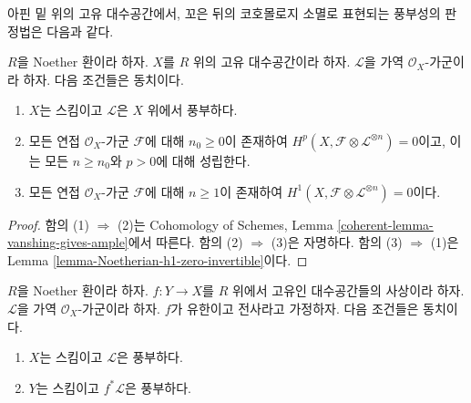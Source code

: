 \noindent
아핀 밑 위의 고유 대수공간에서, 꼬은 뒤의 코호몰로지 소멸로
표현되는 풍부성의 판정법은 다음과 같다.

\begin{lemma}
\label{lemma-vanshing-gives-ample}
$R$을 Noether 환이라 하자. $X$를 $R$ 위의 고유 대수공간이라 하자.
$\mathcal{L}$을 가역 $\mathcal{O}_X$-가군이라 하자. 다음 조건들은
동치이다.
\begin{enumerate}
\item $X$는 스킴이고 $\mathcal{L}$은 $X$ 위에서 풍부하다.
\item 모든 연접 $\mathcal{O}_X$-가군 $\mathcal{F}$에 대해
$n_0 \geq 0$이 존재하여
$H^p(X, \mathcal{F} \otimes \mathcal{L}^{\otimes n}) = 0$이고, 이는
모든 $n \geq n_0$와 $p > 0$에 대해 성립한다.
\item 모든 연접 $\mathcal{O}_X$-가군 $\mathcal{F}$에 대해
$n \geq 1$이 존재하여
$H^1(X, \mathcal{F} \otimes \mathcal{L}^{\otimes n}) = 0$이다.
\end{enumerate}
\end{lemma}

\begin{proof}
함의 (1) $\Rightarrow$ (2)는 Cohomology of Schemes, Lemma
\ref{coherent-lemma-vanshing-gives-ample}에서 따른다. 함의 (2)
$\Rightarrow$ (3)은 자명하다. 함의 (3) $\Rightarrow$ (1)은
Lemma \ref{lemma-Noetherian-h1-zero-invertible}이다.
\end{proof}

\begin{lemma}
\label{lemma-surjective-finite-morphism-ample}
$R$을 Noether 환이라 하자. $f : Y \to X$를 $R$ 위에서 고유인
대수공간들의 사상이라 하자. $\mathcal{L}$을 가역
$\mathcal{O}_X$-가군이라 하자. $f$가 유한이고 전사라고 가정하자.
다음 조건들은 동치이다.
\begin{enumerate}
\item $X$는 스킴이고 $\mathcal{L}$은 풍부하다.
\item $Y$는 스킴이고 $f^*\mathcal{L}$은 풍부하다.
\end{enumerate}
\end{lemma}

